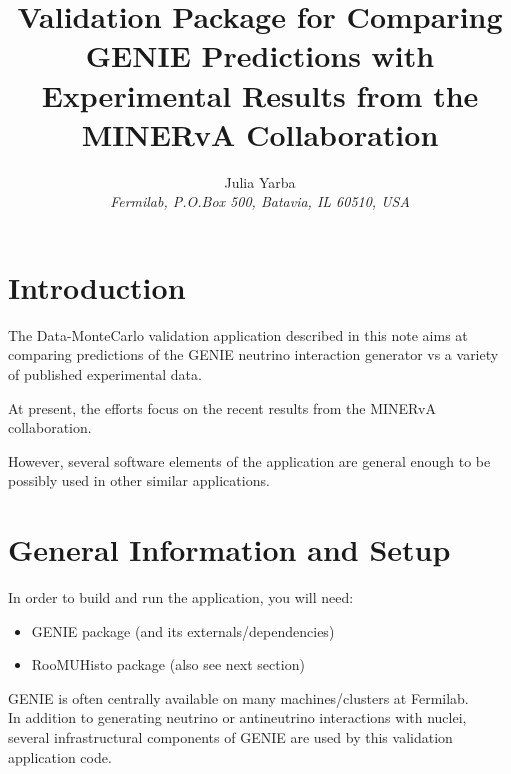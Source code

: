 


\oddsidemargin=10mm
\evensidemargin=-10mm
\topmargin=0mm
\headheight=0mm
\headsep=0mm
\textheight=230mm
\textwidth=175mm
\voffset=-0.5cm
\hoffset=-1.5cm



\title{ 
Validation Package for Comparing GENIE Predictions with Experimental Results from the MINERvA Collaboration
}
\author{
Julia Yarba                             \\
{\em Fermilab, P.O.Box 500, Batavia, IL 60510, USA} \\
}
\maketitle

\baselineskip=17pt

\section{Introduction}

The Data-MonteCarlo validation application described in this note aims at comparing predictions of the GENIE\cite{geniemanual} 
neutrino interaction generator vs a variety of published experimental data.

At present, the efforts focus on the recent results from the MINERvA collaboration\cite{minerva1}.

However, several software elements of the application are general enough to be possibly used in other 
similar applications.

\section{General Information and Setup}

In order to build and run the application, you will need:
\begin{itemize}
\item{GENIE package (and its externals/dependencies)}
\item{RooMUHisto package\cite{roomuhistos} (also see next section)}
\end{itemize}

GENIE is often centrally available on many machines/clusters at Fermilab. \\
In addition to generating neutrino or antineutrino interactions with nuclei, several infrastructural components 
of GENIE are used by this validation application code.

